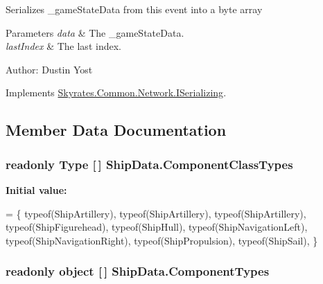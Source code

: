 Serializes \-\_\-game\-State\-Data from this event into a byte array 


\begin{DoxyParams}{Parameters}
{\em data} & The \-\_\-game\-State\-Data.\\
\hline
{\em last\-Index} & The last index.\\
\hline
\end{DoxyParams}


Author\-: Dustin Yost 

Implements \hyperlink{interface_skyrates_1_1_common_1_1_network_1_1_i_serializing_a1433635010dc809984bb621d857f9489}{Skyrates.\-Common.\-Network.\-I\-Serializing}.



\subsection{Member Data Documentation}
\hypertarget{class_ship_data_a725a1caabab53787c0f5ea3e4f71b9cf}{
\subsubsection[{Component\-Class\-Types}]{\setlength{\rightskip}{0pt plus 5cm}readonly Type \mbox{[}$\,$\mbox{]} Ship\-Data.\-Component\-Class\-Types\hspace{0.3cm}{\ttfamily [static]}}}\label{class_ship_data_a725a1caabab53787c0f5ea3e4f71b9cf}
{\bfseries Initial value\-:}
\begin{DoxyCode}
=
    \{
        typeof(ShipArtillery),
        typeof(ShipArtillery),
        typeof(ShipArtillery),
        typeof(ShipFigurehead),
        typeof(ShipHull),
        typeof(ShipNavigationLeft),
        typeof(ShipNavigationRight),
        typeof(ShipPropulsion),
        typeof(ShipSail),
    \}
\end{DoxyCode}
\hypertarget{class_ship_data_a47c222837040afdb00f4363070b5d8df}{
\subsubsection[{Component\-Types}]{\setlength{\rightskip}{0pt plus 5cm}readonly object \mbox{[}$\,$\mbox{]} Ship\-Data.\-Component\-Types\hspace{0.3cm}{\ttfamily [static]}}}\label{class_ship_data_a47c222837040afdb00f4363070b5d8df}
